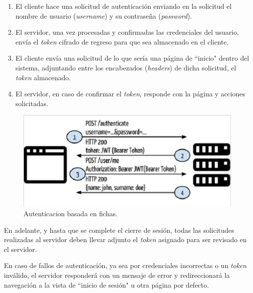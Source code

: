     \begin{enumerate}
        \item El cliente hace una solicitud de autenticación enviando en la solicitud el nombre de usuario (\textit{username}) y su contraseña (\textit{password}).
        \item El servidor, una vez procesadas y confirmadas las credenciales del usuario, envía el \textit{token} cifrado de regreso para que sea almacenado en el cliente.
        \item El cliente envía una solicitud de lo que sería una página de ``inicio" dentro del sistema, adjuntando entre los encabezados (\textit{headers}) de dicha solicitud, el \textit{token} almacenado.
        \item El servidor, en caso de confirmar el \textit{token}, responde con la página y acciones solicitadas.
    \end{enumerate}
    
    \begin{figure}[htbp!]
        \begin{center}
            \includegraphics[width=.7\textwidth]{figures/tokenbarequest}
        \end{center}
        \caption{Autenticacion basada en fichas.}
        \label{tba-request}
    \end{figure}
    
    En adelante, y hasta que se complete el cierre de sesión, todas las solicitudes realizadas al servidor deben llevar adjunto el \textit{token} asignado para ser revisado en el servidor.
    
    En caso de fallos de autenticación, ya sea por credenciales incorrectas o un \textit{token} inválido, el servidor responderá con un mensaje de error y redireccionará la navegación a la vista de ``inicio de sesión" u otra página por defecto.
    
    
